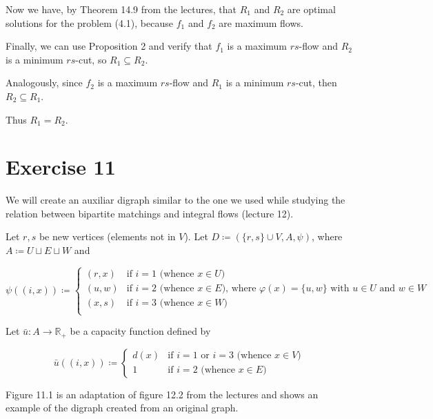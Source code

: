 \documentclass[a4paper,10pt, leqno]{article}
\theoremstyle{definition}
\def\blankpage{%
      \null%
      \clearpage}
\begin{document}
Now we have, by Theorem 14.9 from the lectures, that $R_1$ and $R_2$ are optimal solutions for the problem (4.1), because $f_1$ and $f_2$ are maximum flows.

Finally, we can use Proposition 2 and verify that $f_1$ is a maximum $rs$-flow and $R_2$ is a minimum $rs$-cut, so $R_1 \subseteq R_2$.

Analogously, since $f_2$ is a maximum $rs$-flow and $R_1$ is a minimum $rs$-cut, then $R_2 \subseteq R_1$.

Thus $R_1 = R_2$.

\blankpage

\section*{Exercise 11}

We will create an auxiliar digraph similar to the one we used while studying the relation between bipartite matchings and integral flows (lecture 12).

Let $r, s$ be new vertices (elements not in $V$). Let $D \coloneqq (\{r, s\} \cup V, A, \psi)$, where $A \coloneqq U \sqcup E \sqcup W$ and

$$
\psi((i, x)) \coloneqq
\left\{
	\begin{array}{ll}
		(r, x)  & \mbox{if } i = 1 \text{ (whence } x \in U) \\
		(u, w)  & \mbox{if } i = 2 \text{ (whence } x \in E) \text{, where } \varphi(x) = \{u, w\} \text{ with } u \in U \text{ and } w \in W \\
		(x, s)  & \mbox{if } i = 3 \text{ (whence } x \in W) \\
	\end{array}
\right.
$$

Let $\bar{u} : A \to \mathbb{R}_+ $ be a capacity function defined by

$$
\bar{u}((i, x)) \coloneqq
\left\{
	\begin{array}{ll}
		d(x)  & \mbox{if } i = 1 \text{ or } i = 3 \text{ (whence } x \in V) \\
		1  & \mbox{if } i = 2 \text{ (whence } x \in E)
	\end{array}
\right.
$$

Figure 11.1 is an adaptation of figure 12.2 from the lectures and shows an example of the digraph created from an original graph.
\end{document}
